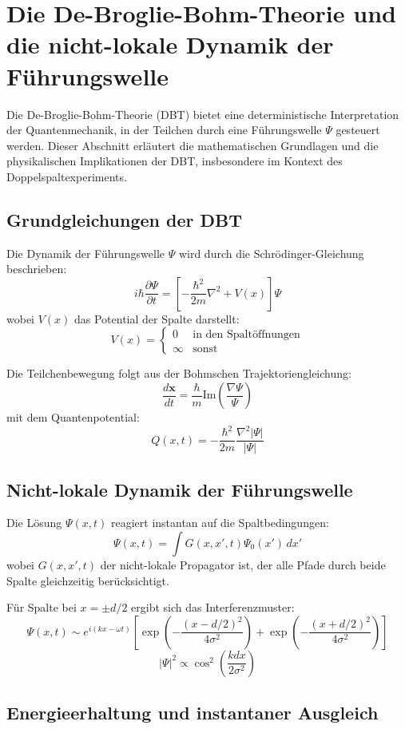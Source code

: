 \newpage
\section{Die De-Broglie-Bohm-Theorie und die nicht-lokale Dynamik der Führungswelle}

Die De-Broglie-Bohm-Theorie (DBT) bietet eine deterministische Interpretation der Quantenmechanik, in der Teilchen durch eine Führungswelle $\Psi$ gesteuert werden. Dieser Abschnitt erläutert die mathematischen Grundlagen und die physikalischen Implikationen der DBT, insbesondere im Kontext des Doppelspaltexperiments.

\subsection{Grundgleichungen der DBT}

Die Dynamik der Führungswelle $\Psi$ wird durch die Schrödinger-Gleichung beschrieben:
\[ i\hbar\frac{\partial\Psi}{\partial t} = \left[-\frac{\hbar^2}{2m}\nabla^2 + V(x)\right]\Psi \]
wobei $V(x)$ das Potential der Spalte darstellt:
\[ V(x) = \begin{cases} 
0 & \text{in den Spaltöffnungen} \\
\infty & \text{sonst}
\end{cases} \]

Die Teilchenbewegung folgt aus der Bohmschen Trajektoriengleichung:
\[ \frac{d\mathbf{x}}{dt} = \frac{\hbar}{m}\text{Im}\left(\frac{\nabla\Psi}{\Psi}\right) \]
mit dem Quantenpotential:
\[ Q(x,t) = -\frac{\hbar^2}{2m}\frac{\nabla^2|\Psi|}{|\Psi|} \]

\subsection{Nicht-lokale Dynamik der Führungswelle}

Die Lösung $\Psi(x,t)$ reagiert instantan auf die Spaltbedingungen:
\[ \Psi(x,t) = \int G(x,x',t)\Psi_0(x')\,dx' \]
wobei $G(x,x',t)$ der nicht-lokale Propagator ist, der alle Pfade durch beide Spalte gleichzeitig berücksichtigt.

Für Spalte bei $x = \pm d/2$ ergibt sich das Interferenzmuster:
\[ \Psi(x,t) \sim e^{i(kx-\omega t)}\left[\exp\left(-\frac{(x-d/2)^2}{4\sigma^2}\right) + \exp\left(-\frac{(x+d/2)^2}{4\sigma^2}\right)\right] \]
\[ |\Psi|^2 \propto \cos^2\left(\frac{kdx}{2\sigma^2}\right) \]

\subsection{Energieerhaltung und instantaner Ausgleich}

